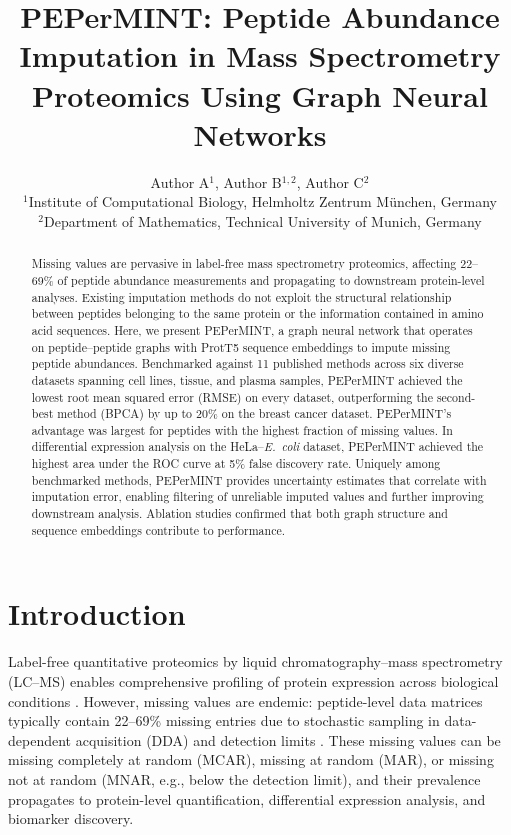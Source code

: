 \documentclass[11pt]{article}
\title{PEPerMINT: Peptide Abundance Imputation in Mass Spectrometry Proteomics Using Graph Neural Networks}
\author{Author A$^{1}$, Author B$^{1,2}$, Author C$^{2}$\\
\small $^{1}$Institute of Computational Biology, Helmholtz Zentrum M\"unchen, Germany\\
\small $^{2}$Department of Mathematics, Technical University of Munich, Germany}
\date{}
\begin{document}
\maketitle

\begin{abstract}
Missing values are pervasive in label-free mass spectrometry proteomics, affecting 22--69\% of peptide abundance measurements and propagating to downstream protein-level analyses. Existing imputation methods do not exploit the structural relationship between peptides belonging to the same protein or the information contained in amino acid sequences. Here, we present PEPerMINT, a graph neural network that operates on peptide--peptide graphs with ProtT5 sequence embeddings to impute missing peptide abundances. Benchmarked against 11 published methods across six diverse datasets spanning cell lines, tissue, and plasma samples, PEPerMINT achieved the lowest root mean squared error (RMSE) on every dataset, outperforming the second-best method (BPCA) by up to 20\% on the breast cancer dataset. PEPerMINT's advantage was largest for peptides with the highest fraction of missing values. In differential expression analysis on the HeLa--\textit{E.\ coli} dataset, PEPerMINT achieved the highest area under the ROC curve at 5\% false discovery rate. Uniquely among benchmarked methods, PEPerMINT provides uncertainty estimates that correlate with imputation error, enabling filtering of unreliable imputed values and further improving downstream analysis. Ablation studies confirmed that both graph structure and sequence embeddings contribute to performance.
\end{abstract}

\section{Introduction}

Label-free quantitative proteomics by liquid chromatography--mass spectrometry (LC--MS) enables comprehensive profiling of protein expression across biological conditions \citep{aebersold2016mass, cox2014maxquant}. However, missing values are endemic: peptide-level data matrices typically contain 22--69\% missing entries due to stochastic sampling in data-dependent acquisition (DDA) and detection limits \citep{lazar2016accounting, webb2015review}. These missing values can be missing completely at random (MCAR), missing at random (MAR), or missing not at random (MNAR, e.g., below the detection limit), and their prevalence propagates to protein-level quantification, differential expression analysis, and biomarker discovery.
\end{document}
